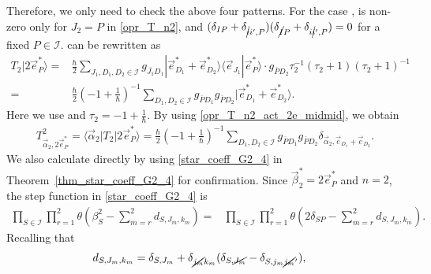 \documentclass[pdftex]{sigma}
\numberwithin{equation}{section}
\begin{document}
Therefore, we only need to check the above four patterns. For the case
,
is non-zero only for
$
J_{2}
=
P
$
in \eqref{opr_T_n2},
and
$
 (
\delta_{IP}
+
\delta_{\cancel{i}i',P}
 )
 (
\delta_{\cancel{I}P}
+
\delta_{i\cancel{i}',P}
 )
=
0
$
for a fixed $P\in\mathcal{I}$.
can be rewritten as
\begin{align}
T_{2}
|
2
\vec{e}_{P}^{\ast}
\rangle
={}&
\frac{\hbar}{2}
\sum_{
J_{1},D_{1},D_{2}
\in
\mathcal{I}
}
g_{\overline{J_{1}}D_{1}}
|
 \vec{e}_{D_{1}}^{\ast}
 +
 \vec{e}_{D_{2}}^{\ast}
\rangle
\big\langle
\vec{e}_{J_{1}}
|
\vec{e}_{P}^{\ast}
\rangle
\cdot
g_{\overline{P}D_{2}}
\tau_{2}^{-1}
 (
 \tau_{2}
 +
 1
 )
 (
 \tau_{2}
 +
 1
 )^{-1}
\nonumber
\\
={}&
\frac{\hbar}{2}
 \left(
-1
+
\frac{1}{\hbar}
 \right)^{-1}
\sum_{
D_{1},D_{2}
\in
\mathcal{I}
}
g_{\overline{P}D_{1}}
g_{\overline{P}D_{2}}
|
 \vec{e}_{D_{1}}^{\ast}
 +
 \vec{e}_{D_{2}}^{\ast}
\rangle.
\label{opr_T_n2_act_2e_midmid}
\end{align}
Here we use
and
$
\tau_{2}
=
-1
+
\frac{1}{\hbar}
$.
By using \eqref{opr_T_n2_act_2e_midmid}, we obtain
\begin{align}
T^{2}_{\vec{\alpha}_{2},2\vec{e}_{P}^{\ast}}
=
\langle
\vec{\alpha}_{2}
|
T_{2}
|
2
\vec{e}_{P}^{\ast}
\rangle
=
\frac{\hbar}{2}
 \left(
-1
+
\frac{1}{\hbar}
 \right)^{-1}
\sum_{
D_{1},D_{2}
\in
\mathcal{I}
}
g_{\overline{P}D_{1}}
g_{\overline{P}D_{2}}
\delta_{
\vec{\alpha}_{2},
\vec{e}_{D_{1}}
+
\vec{e}_{D_{2}}
}
.
\label{T2_2e_opr}
\end{align}
We also calculate directly  by using \eqref{star_coeff_G2_4} in Theorem~\ref{thm_star_coeff_G2_4} for confirmation. Since
$
\vec{\beta}_{2}^{\ast}
=
2\vec{e}_{P}^{\ast}
$
and $n=2$, the step function in \eqref{star_coeff_G2_4} is
\begin{align*}
\prod_{
S
\in
\mathcal{I}
}
\prod_{r=1}^{2}
\theta
 \left(
 \beta_{S}^{2}
 -
 \sum_{m=r}^{2}
 d_{S,J_{m},k_{m}}
 \right)
=&
\prod_{
S
\in
\mathcal{I}
}
\prod_{r=1}^{2}
\theta
 \left(
 2
 \delta_{SP}
 -
 \sum_{m=r}^{2}
 d_{S,J_{m},k_{m}}
 \right)
.
\end{align*}
Recalling that
\begin{align*}
d_{
 S,
 J_{m},
 k_{m}
}
={}&
\delta_{
 S,
 J_{m}
}
+
\delta_{\cancel{j_{m}}k_{m}}
 (
 \delta_{
 S,
 \cancel{J_{m}}
 }
 -
 \delta_{
 S,
 j_{m}\cancel{j_{m}}'
 }
 )
,
\end{align*}
\end{document}
